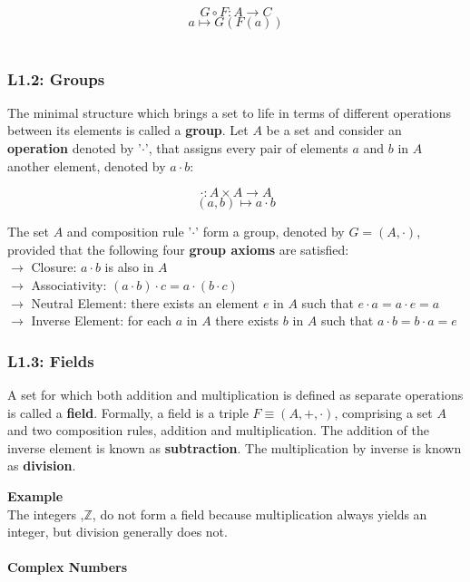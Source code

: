 \documentclass[11pt, oneside]{article}   	%
\begin{document}
\[ G \circ F: A \rightarrow C\] 
\[a \mapsto G(F(a)) \] \\

\subsubsection{L1.2: Groups} 

The minimal structure which brings a set to life in terms of different operations between its elements is called a \textbf{group}. Let $A$ be a set and consider an \textbf{operation} denoted by '$\cdot$', that assigns every pair of elements $a$ and $b$ in $A$ another element, denoted by $a \cdot b$: 

\[ \cdot : A \times A \rightarrow A \]
\[(a,b) \mapsto a\cdot b\] 

The set $A$ and composition rule '$\cdot$' form a group, denoted by $G=(A, \cdot)$, provided that the following four \textbf{group axioms} are satisfied: \\
$\rightarrow$ Closure: $a\cdot b$ is also in $A$ \\
$\rightarrow$ Associativity: $(a \cdot b) \cdot c = a \cdot (b \cdot c)$ \\
$\rightarrow$ Neutral Element: there exists an element $e$ in $A$ such that $e \cdot a = a \cdot e = a$\\
$\rightarrow$ Inverse Element: for each $a$ in $A$ there exists $b$ in $A$ such that $a \cdot b = b \cdot a = e$ \\

\subsubsection{L1.3: Fields}

A set for which both addition and multiplication is defined as separate operations is called a \textbf{field}. Formally, a field is a triple $F \equiv (A, +, \cdot)$, comprising a set $A$ and two composition rules, addition and multiplication. The addition of the inverse element is known as \textbf{subtraction}. The multiplication by inverse is known as \textbf{division}. 

\textbf{Example} \\
The integers ,$\mathbb{Z}$, do not form a field because multiplication always yields an integer, but division generally does not. 

\paragraph{Complex Numbers} 
\end{document}
